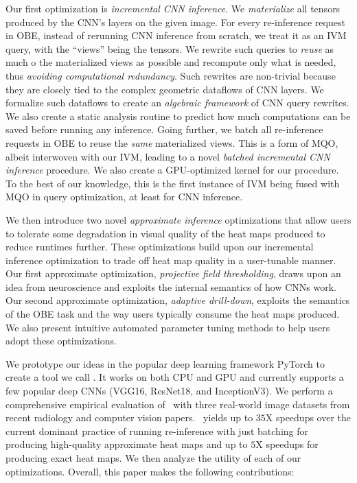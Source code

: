Our first optimization is \textit{incremental CNN inference}. We \textit{materialize} all tensors produced by the CNN's layers on the given image. For every re-inference request in OBE, instead of rerunning CNN inference from scratch, we treat it as an IVM query, with the ``views'' being the tensors. We rewrite such queries to \textit{reuse} as much o the materialized views as possible and recompute only what is needed, thus \textit{avoiding computational redundancy}. Such rewrites are non-trivial because they are closely tied to the complex geometric dataflows of CNN layers. We formalize such dataflows to create an \textit{algebraic framework} of CNN query rewrites. We also create a static analysis routine to predict how much computations can be saved before running any inference. Going further, we batch all re-inference requests in OBE to reuse the \textit{same} materialized views. This is a form of MQO, albeit interwoven with our IVM, leading to a novel \textit{batched incremental CNN inference} procedure. We also create a GPU-optimized kernel for our procedure. To the best of our knowledge, this is the first instance of IVM being fused with MQO in query optimization, at least for CNN inference.

We then introduce two novel \textit{approximate inference} optimizations that allow users to tolerate some degradation in visual quality of the heat maps produced to reduce runtimes further. These optimizations build upon our incremental inference optimization to trade off heat map quality in a user-tunable manner. Our first approximate optimization, \textit{projective field thresholding}, draws upon an idea from neuroscience and exploits the internal semantics of how CNNs work. Our second approximate optimization, \textit{adaptive drill-down}, exploits the semantics of the OBE task and the way users typically consume the heat maps produced. We also present intuitive automated parameter tuning methods to help users adopt these optimizations.

We prototype our ideas in the popular deep learning framework PyTorch to create a tool we call \system. It works on both CPU and GPU and currently supports a few popular deep CNNs (VGG16, ResNet18, and InceptionV3). We perform a comprehensive empirical evaluation of \system ~with three real-world image datasets from recent radiology and computer vision papers. \system ~yields up to $35$X speedups over the current dominant practice of running re-inference with just batching for producing high-quality approximate heat maps and up to $5$X speedups for producing exact heat maps. We then analyze the utility of each of our optimizations. Overall, this paper makes the following contributions:

